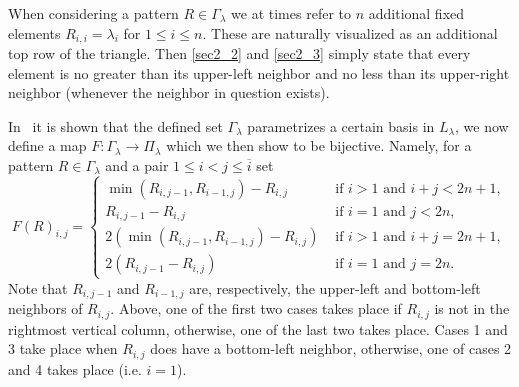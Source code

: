\documentclass[ALCO,ThmDefs,Unicode]{cedram}
\newcommand{\la}{\lambda}
\begin{document}
When considering a pattern $R\in\Gamma_\la$ we at times refer to $n$ additional fixed elements $R_{i,i}=\la_i$ for $1\le i\le n$. These are naturally visualized as an additional top row of the triangle. Then \eqref{sec2_2}  and \eqref{sec2_3} simply state that every element is no greater than its upper-left neighbor and no less than its upper-right neighbor (whenever the neighbor in question exists).

In~\cite{Mo} it is shown that the defined set $\Gamma_\la$ parametrizes a certain basis in $L_\la$, we now define a map $F:\Gamma_\la\to\Pi_\la$ which we then show to be bijective. Namely, for a pattern $R\in\Gamma_\la$ and a pair $1\le i<j\le\overline i$ set
\[
F(R)_{i,j}=
\begin{cases}
\min(R_{i,j-1},R_{i-1,j})-R_{i,j}&\text{ if }i>1\text{ and }i+j<2n+1,\\
R_{i,j-1}-R_{i,j}&\text{ if }i=1\text{ and }j<2n,\\
2(\min(R_{i,j-1},R_{i-1,j})-R_{i,j})&\text{ if }i>1\text{ and }i+j=2n+1,\\
2(R_{i,j-1}-R_{i,j})&\text{ if }i=1\text{ and }j=2n.
\end{cases}
\]
Note that $R_{i,j-1}$ and $R_{i-1,j}$ are, respectively, the upper-left and bottom-left neighbors of $R_{i,j}$. Above, one of the first two cases takes place if $R_{i,j}$ is not in the rightmost vertical column, otherwise, one of the last two takes place. Cases 1 and 3 take place when $R_{i,j}$ does have a bottom-left neighbor, otherwise, one of cases 2 and 4 takes place (i.e. $i=1$).
\end{document}
